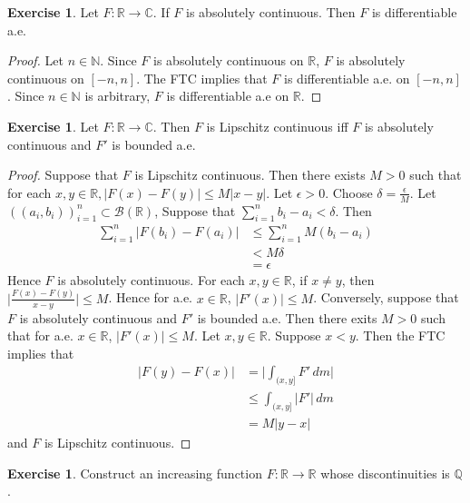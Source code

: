 \documentclass{book}
\theoremstyle{definition}
\newtheorem{ex}[definition]{Exercise}
\newcommand{\del}{\delta}
\newcommand{\ep}{\epsilon}
\newcommand{\C}{\mathbb{C}}
\newcommand{\N}{\mathbb{N}}
\newcommand{\Q}{\mathbb{Q}}
\newcommand{\R}{\mathbb{R}}
\newcommand{\MB}{\mathcal{B}}
\newcommand{\lex}[1]{\label{ex:#1}}
\DeclareMathOperator*{\0}{\mbf{0}}
\DeclareMathOperator*{\1}{\mbf{1}}
\newcommand{\dm}{\, d m}
\begin{document}
	\begin{ex} \lex{00000} 
		Let $F: \R \rightarrow \C$. If $F$ is absolutely continuous. Then $F$ is differentiable a.e.
	\end{ex}
	
	\begin{proof}
		Let $n \in \N$. Since $F$ is absolutely continuous on $\R$, $F$ is absolutely continuous on $[-n,n]$. The FTC implies that $F$ is differentiable a.e. on $[-n,n]$. Since $n \in \N$ is arbitrary, $F$ is differentiable a.e on $\R$.
	\end{proof}
	
	\begin{ex} \lex{00000} 
		Let $F: \R \rightarrow \C$. Then $F$ is Lipschitz continuous iff $F$ is absolutely continuous and $F'$ is bounded a.e.
	\end{ex}
	
	\begin{proof}
		Suppose that $F$ is Lipschitz continuous. Then there exists $M>0$ such that for each $x,y \in \R, |F(x)-F(y)| \leq M|x-y|$. Let $\ep >0$. Choose $\del = \frac{\ep}{M}$. Let $((a_i, b_i))_{i=1}^n \subset \MB(\R)$, Suppose that $\sum_{i=1}^n b_i-a_i < \del$. Then 
		\begin{align*}
			\sum_{i=1}^n|F(b_i)-F(a_i)| 
			&\leq \sum_{i=1}^n M(b_i - a_i)\\
			&< M\del\\
			&= \ep
		\end{align*}
		Hence $F$ is absolutely continuous. For each $x, y \in \R$, if $x \neq y$, then $\bigg|\frac{F(x)-F(y)}{x-y}\bigg| \leq M$. Hence for a.e. $x \in \R$, $|F'(x)| \leq M$. Conversely, suppose that $F$ is absolutely continuous and $F'$ is bounded a.e. Then there exits $M> 0$ such that for a.e. $x \in \R$, $|F'(x)| \leq M$. Let $x,y \in \R$. Suppose $x<y$. Then the FTC implies that 
		\begin{align*}
			|F(y)-F(x)|
			& = \bigg|\int_{(x,y]}F'\dm\bigg|\\
			&\leq \int_{(x,y]}|F'|\dm\\
			&=M|y-x|
		\end{align*}
		and $F$ is Lipschitz continuous.
	\end{proof}
	
	\begin{ex} \lex{00000} 
		Construct an increasing function $F: \R \rightarrow \R$ whose discontinuities is $\Q$.
	\end{ex}
	
\end{document}
